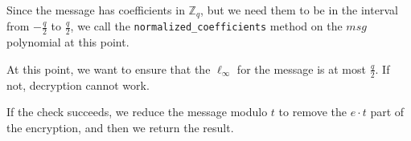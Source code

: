 \documentclass[../main.tex]{subfiles}
\begin{document}
Since the message has coefficients in $\mathbb{Z}_q$, but we need them to be in the interval from $-\frac{q}{2}$ to $\frac{q}{2}$, we call the \lstinline{normalized_coefficients} method on the $msg$ polynomial at this point.

At this point, we want to ensure that the $\ell_\infty$ for the message is at most $\frac{q}{2}$. If not, decryption cannot work.

If the check succeeds, we reduce the message modulo $t$ to remove the $e \cdot t$ part of the encryption, and then we return the result.
\end{document}
